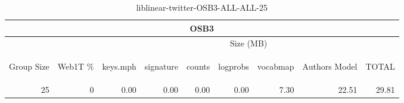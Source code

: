 \begin{center}
\begin{table}[htbp] 
 \begin{center}
\begin{tabular}{ | r | r | r | r | r | r | r | r | r |}
\hline
\multicolumn{9}{|c|}{OSB3}\\
\hline
 & & \multicolumn{7}{|c|}{Size (MB)}\\ \cline{3-9}
\begin{sideways}Group Size\end{sideways} & \begin{sideways}Web1T \% \end{sideways} & \begin{sideways}keys.mph\end{sideways} & \begin{sideways}signature\end{sideways} & \begin{sideways}counts\end{sideways} & \begin{sideways}logprobs\end{sideways} & \begin{sideways}vocabmap\end{sideways} & \begin{sideways}Authors Model \end{sideways} & \begin{sideways}TOTAL\end{sideways}\\
\hline
\multirow{0}{*}{25}
 & 0 & 0.00 & 0.00 & 0.00 & 0.00 & 7.30 & 22.51 & 29.81\\ \cline{2-9}
\hline
\end{tabular}
\caption{liblinear-twitter-OSB3-ALL-ALL-25}
\label{table:liblinear-twitter-OSB3-ALL-ALL-25}
\end{center}
 \end{table}
\end{center}

